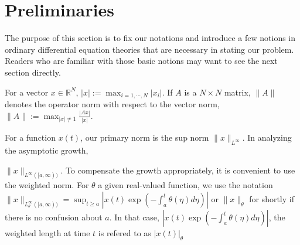 \documentclass[a4paper,11pt]{article}
\def\blue{\color{blue}}
\newcounter{Theorem}
\theoremstyle{remark}
\begin{document}
% 
% 
% 
% 



\section{Preliminaries} \label{section2}

The purpose of this section is to fix our notations and introduce a few notions in ordinary differential equation theories that are necessary in stating our problem. Readers who are familiar with those basic notions may want to see the next section directly.

For a vector $x \in \mathbb{R}^N$, $|x|:=\displaystyle\max_{i=1,\cdots,N} |x_i|$. If $A$ is a $N\times N$ matrix, $\|A\|$ denotes the operator norm with respect to the vector norm, $\|A\|:= \displaystyle\max_{|x|\ne 1} \frac{ |Ax|}{|x|}$. 


{\blue
For a function $x(t)$, our primary norm is the sup norm $\|x\|_{L^\infty}$. In analyzing the asymptotic growth, 

$\|x\|_{L^\infty([a,\infty))}$.  To compensate the growth appropriately, it is convenient to use the weighted norm. For $\theta$ a given real-valued function, we use the notation $\displaystyle\|x\|_{L^\infty_\theta([a,\infty))} = \sup_{t\ge a} \left|x(t) \exp\left( -\int_a^t \theta(\eta) d\eta\right)\right|$ or $\|x\|_\theta$ for shortly if there is no confusion about $a$. In that case, $\left|x(t) \exp\left( -\int_a^t \theta(\eta) d\eta\right)\right|$, the weighted length at time $t$ is refered to as $|x(t)|_\theta$
}
\end{document}
